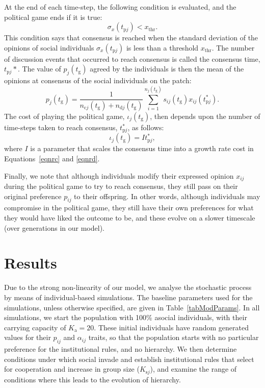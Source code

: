 \documentclass{rstb}
\begin{document}
\begin{linenumbers}
At the end of each time-step, the following condition is evaluated, and the political game ends if it is true:
\begin{equation}
    \sigma_x(t_{\mathrm{p}j}) < x_\mathrm{thr}.
    \label{eqnConsensus}
\end{equation}
This condition says that consensus is reached when the standard deviation of the opinions of social individuals $\sigma_x(t_{\mathrm{p}j})$ is less than a threshold $x_\mathrm{thr}$. The number of discussion events that occurred to reach consensus is called the consensus time, $t_{\mathrm{p}j}*$. The value of $p_j(t_\mathrm{g})$ agreed by the individuals is then the mean of the opinions at consensus of the social individuals on the patch:
\begin{equation}
    p_j(t_\mathrm{g}) = \frac{1}{n_{\mathrm{c}j}(t_\mathrm{g})+n_{\mathrm{d}j}(t_\mathrm{g})} \sum_{i=1}^{n_{j}(t_\mathrm{g})} s_{ij}(t_\mathrm{g})x_{ij}(t_{\mathrm{p}j}^*).
    \label{eqnFinalP}
\end{equation}
The cost of playing the political game, $\iota_j(t_\mathrm{g})$, then depends upon the number of time-steps taken to reach consensus, $t_{\mathrm{p}j}^*$, as follows:
\begin{equation}
    \iota_j(t_\mathrm{g}) = I t_{\mathrm{p}j}^*,
    \label{eqnInstCost}
\end{equation}
where $I$ is a parameter that scales the consensus time into a growth rate cost in Equations~\ref{eqnrc} and \ref{eqnrd}.

Finally, we note that although individuals modify their expressed opinion $x_{ij}$ during the political game to try to reach consensus, they still pass on their original preference $p_{ij}$ to their offspring. In other words, although individuals may compromise in the political game, they still have their own preferences for what they would have liked the outcome to be, and these evolve on a slower timescale (over generations in our model).

\section*{Results}
Due to the strong non-linearity of our model, we analyse the stochastic process by means of individual-based simulations. The baseline parameters used for the simulations, unless otherwise specified, are given in Table~\ref{tabModParams}. In all simulations, we start the population with 100\% asocial individuals, with their carrying capacity of $K_\mathrm{a}=20$. These initial individuals have random generated values for their $p_{ij}$ and $\alpha_{ij}$ traits, so that the population starts with no particular preference for the institutional rules, and no hierarchy. We then determine conditions under which social invade and establish institutional rules that select for cooperation and increase in group size ($K_{\mathrm{s}j}$), and examine the range of conditions where this leads to the evolution of hierarchy. 


\end{linenumbers}
\end{document}
